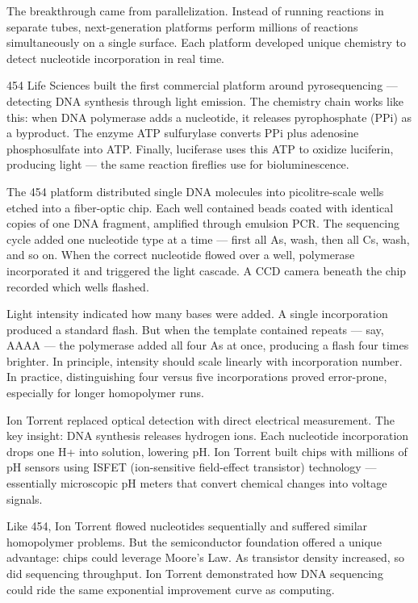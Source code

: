 The breakthrough came from parallelization. Instead of running reactions in separate tubes, next-generation platforms perform millions of reactions simultaneously on a single surface. Each platform developed unique chemistry to detect nucleotide incorporation in real time.

454 Life Sciences built the first commercial platform around pyrosequencing — detecting DNA synthesis through light emission. The chemistry chain works like this: when DNA polymerase adds a nucleotide, it releases pyrophosphate (PPi) as a byproduct. The enzyme ATP sulfurylase converts PPi plus adenosine phosphosulfate into ATP. Finally, luciferase uses this ATP to oxidize luciferin, producing light — the same reaction fireflies use for bioluminescence.

The 454 platform distributed single DNA molecules into picolitre-scale wells etched into a fiber-optic chip. Each well contained beads coated with identical copies of one DNA fragment, amplified through emulsion PCR. The sequencing cycle added one nucleotide type at a time — first all As, wash, then all Cs, wash, and so on. When the correct nucleotide flowed over a well, polymerase incorporated it and triggered the light cascade. A CCD camera beneath the chip recorded which wells flashed.

Light intensity indicated how many bases were added. A single incorporation produced a standard flash. But when the template contained repeats — say, AAAA — the polymerase added all four As at once, producing a flash four times brighter. In principle, intensity should scale linearly with incorporation number. In practice, distinguishing four versus five incorporations proved error-prone, especially for longer homopolymer runs.

Ion Torrent replaced optical detection with direct electrical measurement. The key insight: DNA synthesis releases hydrogen ions. Each nucleotide incorporation drops one H+ into solution, lowering pH. Ion Torrent built chips with millions of pH sensors using ISFET (ion-sensitive field-effect transistor) technology — essentially microscopic pH meters that convert chemical changes into voltage signals.

Like 454, Ion Torrent flowed nucleotides sequentially and suffered similar homopolymer problems. But the semiconductor foundation offered a unique advantage: chips could leverage Moore's Law. As transistor density increased, so did sequencing throughput. Ion Torrent demonstrated how DNA sequencing could ride the same exponential improvement curve as computing.

